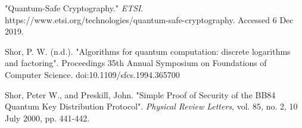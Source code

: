\documentclass[11pt]{article}
\begin{document}
\begin{hangparas}{.25in}{1}
"Quantum-Safe Cryptography." \textit{ETSI}. https://www.etsi.org/technologies/quantum-safe-cryptography. Accessed 6 Dec 2019. 

Shor, P. W. (n.d.). "Algorithms for quantum computation: discrete logarithms and
factoring". Proceedings 35th Annual Symposium on Foundations of Computer Science. doi:10.1109/sfcs.1994.365700 

Shor, Peter W., and Preskill, John. "Simple Proof of Security of the BB84 Quantum Key Distribution Protocol". \textit{Physical Review Letters}, vol. 85, no. 2, 10 July 2000, pp. 441-442. 

\end{hangparas}

\end{document}
